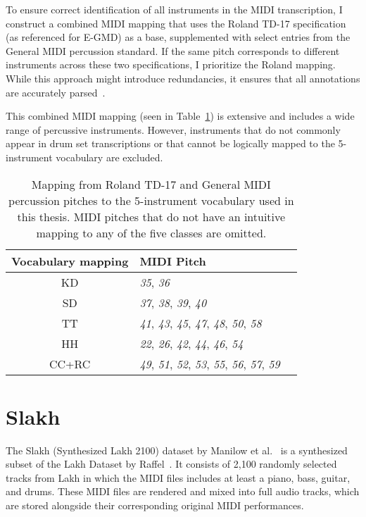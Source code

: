 To ensure correct identification of all instruments in the MIDI transcription, I construct a combined MIDI mapping that uses the Roland TD-17 specification (as referenced for E-GMD) as a base, supplemented with select entries from the General MIDI percussion standard. If the same pitch corresponds to different instruments across these two specifications, I prioritize the Roland mapping. While this approach might introduce redundancies, it ensures that all annotations are accurately parsed~\cite{pmlr-v97-gillick19a, callender2020improvingperceptualqualitydrum}.

This combined MIDI mapping (seen in Table~\ref{RolandMIDIMapping}) is extensive and includes a wide range of percussive instruments. However, instruments that do not commonly appear in drum set transcriptions or that cannot be logically mapped to the 5-instrument vocabulary are excluded.

\begin{table}[H]
    \centering
    \hspace*{-0.6cm}
    \begin{tabular}{c|ll}
        Vocabulary mapping & MIDI Pitch \\
        \hline
        \acrfull{KD} & \textit{35}, \textit{36} \\
        \acrfull{SD} & \textit{37}, \textit{38}, \textit{39}, \textit{40} \\
        \acrfull{TT} & \textit{41}, \textit{43}, \textit{45}, \textit{47}, \textit{48}, \textit{50}, \textit{58} \\
        \acrfull{HH} & \textit{22}, \textit{26}, \textit{42}, \textit{44}, \textit{46}, \textit{54} \\
        \acrfull{CC+RC} & \textit{49}, \textit{51}, \textit{52}, \textit{53}, \textit{55}, \textit{56}, \textit{57}, \textit{59} \\
    \end{tabular}
    \caption{Mapping from Roland TD-17 and General MIDI percussion pitches to the 5-instrument vocabulary used in this thesis. MIDI pitches that do not have an intuitive mapping to any of the five classes are omitted.}
    \label{RolandMIDIMapping}
\end{table}

\section{Slakh}

The Slakh (Synthesized Lakh 2100) dataset by Manilow et al.~\cite{8937170} is a synthesized subset of the Lakh Dataset by Raffel~\cite{raffel2016learning}. It consists of 2,100 randomly selected tracks from Lakh in which the MIDI files includes at least a piano, bass, guitar, and drums. These MIDI files are rendered and mixed into full audio tracks, which are stored alongside their corresponding original MIDI performances.

